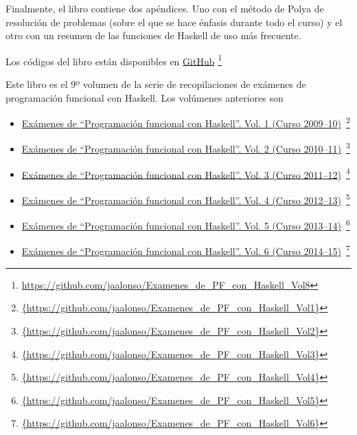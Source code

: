 \documentclass[a4paper,12pt,twoside]{book}
\begin{document}
Finalmente, el libro contiene dos apéndices. Uno con el método de Polya
de resolución de problemas (sobre el que se hace énfasis durante todo el
curso) y el otro con un resumen de las funciones de Haskell de uso más
frecuente.

Los códigos del libro están disponibles en
\href{https://github.com/jaalonso/Examenes_de_PF_con_Haskell_Vol8}
     {GitHub}
     \footnote{{\url{https://github.com/jaalonso/Examenes_de_PF_con_Haskell_Vol8}}}

Este libro es el 9º volumen de la serie de recopilaciones de
exámenes de programación funcional con Haskell. Los volúmenes anteriores son
\begin{itemize}
\item
  \href{https://github.com/jaalonso/Examenes_de_PF_con_Haskell_Vol1}
  {Exámenes de ``Programaci\'on funcional con Haskell''.
    Vol. 1 (Curso 2009--10)}\
    \footnote{\url{{https://github.com/jaalonso/Examenes_de_PF_con_Haskell_Vol1}}}

\item
  \href{https://github.com/jaalonso/Examenes_de_PF_con_Haskell_Vol2}
  {Exámenes de ``Programaci\'on funcional con Haskell''.
    Vol. 2 (Curso 2010--11)}\
    \footnote{\url{{https://github.com/jaalonso/Examenes_de_PF_con_Haskell_Vol2}}}

\item
  \href{https://github.com/jaalonso/Examenes_de_PF_con_Haskell_Vol3}
  {Exámenes de ``Programaci\'on funcional con Haskell''.
    Vol. 3 (Curso 2011--12)}\
    \footnote{\url{{https://github.com/jaalonso/Examenes_de_PF_con_Haskell_Vol3}}}

\item
  \href{https://github.com/jaalonso/Examenes_de_PF_con_Haskell_Vol4}
  {Exámenes de ``Programaci\'on funcional con Haskell''.
    Vol. 4 (Curso 2012--13)}\
    \footnote{\url{{https://github.com/jaalonso/Examenes_de_PF_con_Haskell_Vol4}}}

\item
  \href{https://github.com/jaalonso/Examenes_de_PF_con_Haskell_Vol5}
  {Exámenes de ``Programaci\'on funcional con Haskell''.
    Vol. 5 (Curso 2013--14)}\
    \footnote{\url{{https://github.com/jaalonso/Examenes_de_PF_con_Haskell_Vol5}}}

\item
  \href{https://github.com/jaalonso/Examenes_de_PF_con_Haskell_Vol6}
  {Exámenes de ``Programaci\'on funcional con Haskell''.
    Vol. 6 (Curso 2014--15)}\
    \footnote{\url{{https://github.com/jaalonso/Examenes_de_PF_con_Haskell_Vol6}}}


\end{itemize}
\end{document}
